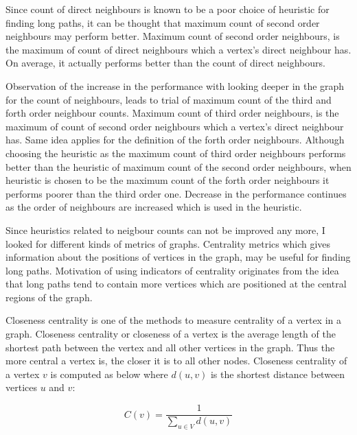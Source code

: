 \documentclass[12pt]{report}
\newcommand\ddfrac[2]{\frac{\displaystyle #1}{\displaystyle #2}}
\begin{document}
            Since count of direct neighbours is known to be a poor choice of heuristic for finding long paths, it can be thought that maximum count of second order neighbours may 
            perform better. Maximum count of second order neighbours, is the maximum of count of direct neighbours which a vertex's direct neighbour has. On average, it actually 
            performs better than the count of direct neighbours.

            Observation of the increase in the performance with looking deeper in the graph for the count of neighbours, leads to trial of maximum count of the third and forth order neighbour 
            counts. Maximum count of third order neighbours, is the maximum of count of second order neighbours which a vertex's direct neighbour has. Same idea applies for the
            definition of the forth order neighbours. Although choosing the heuristic as the maximum count of third order neighbours performs better than the heuristic of maximum 
            count of the second order neighbours, when heuristic is chosen to be the maximum count of the forth order neighbours it performs poorer than the third order one. 
            Decrease in the performance continues as the order of neighbours are increased which is used in the heuristic.
        
            Since heuristics related to neigbour counts can not be improved any more, I looked for different kinds of metrics of graphs. Centrality metrics which gives information
            about the positions of vertices in the graph, may be useful for finding long paths. Motivation of using indicators of centrality originates from the idea that long paths
            tend to contain more vertices which are positioned at the central regions of the graph.   

            Closeness centrality is one of the methods to measure centrality of a vertex in a graph. Closeness centrality or closeness of a vertex is the average length of the 
            shortest path between the vertex and all other vertices in the graph. Thus the more central a vertex is, the closer it is to all other nodes.
            Closeness centrality of a vertex $v$ is computed as below where $d(u,v)$ is the shortest distance between vertices $u$ and $v$:
            
            \bigskip
            \begin{equation}
                C(v) = \ddfrac{1}{\sum_{u \in V} d(u,v)}
            \end{equation}
            \bigskip
\end{document}

